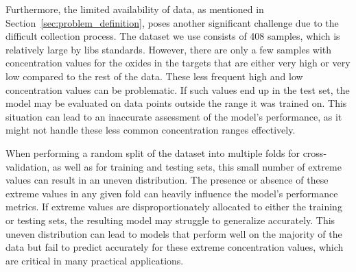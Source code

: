 Furthermore, the limited availability of data, as mentioned in Section~\ref{sec:problem_definition}, poses another significant challenge due to the difficult collection process.
The dataset we use consists of 408 samples, which is relatively large by \gls{libs} standards.
However, there are only a few samples with concentration values for the oxides in the targets that are either very high or very low compared to the rest of the data.
These less frequent high and low concentration values can be problematic.
If such values end up in the test set, the model may be evaluated on data points outside the range it was trained on.
This situation can lead to an inaccurate assessment of the model's performance, as it might not handle these less common concentration ranges effectively.

When performing a random split of the dataset into multiple folds for cross-validation, as well as for training and testing sets, this small number of extreme values can result in an uneven distribution.
The presence or absence of these extreme values in any given fold can heavily influence the model's performance metrics.
If extreme values are disproportionately allocated to either the training or testing sets, the resulting model may struggle to generalize accurately.
This uneven distribution can lead to models that perform well on the majority of the data but fail to predict accurately for these extreme concentration values, which are critical in many practical applications.

